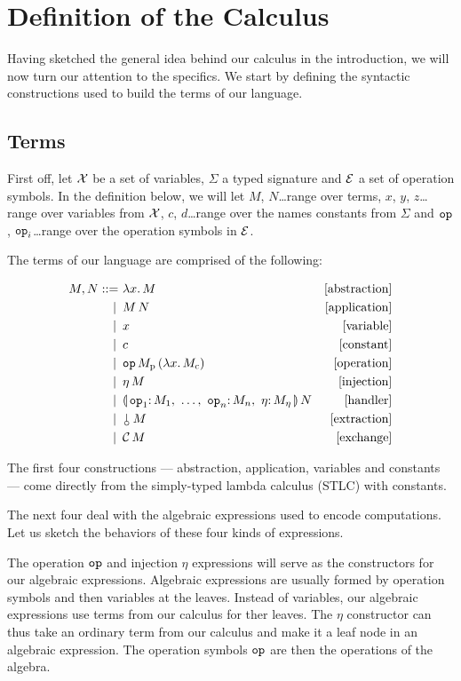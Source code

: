 \documentclass{llncs}
\begin{document}
\section{Definition of the Calculus}
\label{sec:definition}

Having sketched the general idea behind our calculus in the introduction,
we will now turn our attention to the specifics. We start by defining the
syntactic constructions used to build the terms of our language.

\subsection{Terms}
\label{ssec:terms}

First off, let $\mathcal{X}$ be a set of variables, $\Sigma$ a typed signature and
$\mathcal{E}$ a set of operation symbols. In the definition below, we will let $M$,
$N$\ldots range over terms, $x$, $y$, $z$\ldots range over variables from
$\mathcal{X}$, $c$, $d$\ldots range over the names constants from $\Sigma$ and
$\mathtt{op}$, $\mathtt{op}_i$\ldots range over the operation symbols in $\mathcal{E}$.

The terms of our language are comprised of the following:

\begin{align*}
  M, N ::= &\ \lam{x}{M} & \mbox{[abstraction]} \\
   | \, &\ \ap{M}{N}  & \mbox{[application]} \\
   | \, &\ x  & \mbox{[variable]} \\
   | \, &\ c  & \mbox{[constant]} \\
   | \, &\ \app{\op{op}}{M_{\mathrm{p}}}{(\lam{x}{M_{\mathrm{c}}})}  & \mbox{[operation]} \\
   | \, &\ \ap{\eta}{M}  & \mbox{[injection]} \\
   | \, &\ \ap{\cdbanana}{N}  & \mbox{[handler]} \\
   | \, &\ \ap{\cherry}{M}  & \mbox{[extraction]} \\
   | \, &\ \ap{\CC}{M} & \mbox{[exchange]} 
\end{align*}

The first four constructions --- abstraction, application, variables and
constants --- come directly from the simply-typed lambda calculus (STLC)
with constants.

The next four deal with the algebraic expressions used to encode
computations. Let us sketch the behaviors of these four kinds of
expressions.

The operation $\mathtt{op}$ and injection $\eta$ expressions will serve as the
constructors for our algebraic expressions. Algebraic expressions are
usually formed by operation symbols and then variables at the
leaves. Instead of variables, our algebraic expressions use terms from our
calculus for ther leaves. The $\eta$ constructor can thus take an ordinary
term from our calculus and make it a leaf node in an algebraic
expression. The operation symbols $\mathtt{op}$ are then the operations of the
algebra.
\end{document}
